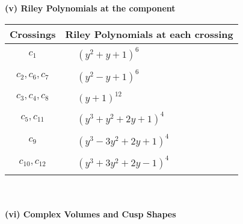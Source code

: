 \documentclass[1p]{elsarticle_modified}
\theoremstyle{definition}
\begin{document}
\newpage\renewcommand{\arraystretch}{1}
\flushleft \textbf{(v) Riley Polynomials at the component}\newline \\
\begin{tabular}{m{50pt}|m{274pt}}
Crossings & \hspace{64pt}Riley Polynomials at each crossing \\
\hline $$\begin{aligned}c_{1}\end{aligned}$$&$\begin{aligned}
&(y^2+y+1)^6
\end{aligned}$\\
\hline $$\begin{aligned}c_{2},c_{6},c_{7}\end{aligned}$$&$\begin{aligned}
&(y^2- y+1)^6
\end{aligned}$\\
\hline $$\begin{aligned}c_{3},c_{4},c_{8}\end{aligned}$$&$\begin{aligned}
&(y+1)^{12}
\end{aligned}$\\
\hline $$\begin{aligned}c_{5},c_{11}\end{aligned}$$&$\begin{aligned}
&(y^3+y^2+2 y+1)^4
\end{aligned}$\\
\hline $$\begin{aligned}c_{9}\end{aligned}$$&$\begin{aligned}
&(y^3-3 y^2+2 y+1)^4
\end{aligned}$\\
\hline $$\begin{aligned}c_{10},c_{12}\end{aligned}$$&$\begin{aligned}
&(y^3+3 y^2+2 y-1)^4
\end{aligned}$\\
\hline
\end{tabular}\\~\\
\newpage\flushleft \textbf{(vi) Complex Volumes and Cusp Shapes}
\end{document}
